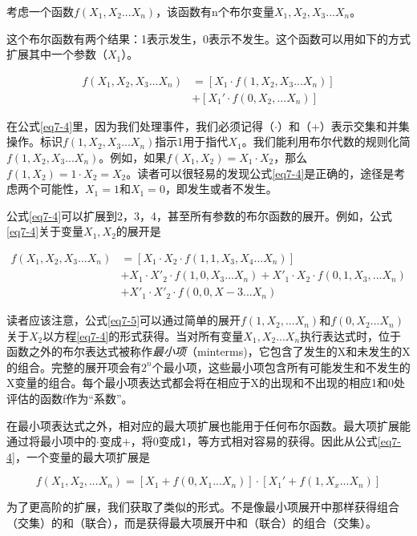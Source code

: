 \documentclass[cn,11pt,chinese]{elegantbook}
\begin{document}
{考虑一个函数$f(X_1,X_2...X_n)$，该函数有n个布尔变量$X_1,X_2,X_3...X_n$。

这个布尔函数有两个结果：1表示发生，0表示不发生。这个函数可以用如下的方式扩展其中一个参数（$X_1$）。

\begin{align}
\label{eq7-4}
f(X_1,X_2,X_3...X_n)&=[X_1 \cdot f(1,X_2,X_3...X_n)] \nonumber \\
&+[X_1' \cdot f(0,X_2,...X_n)]
\end{align}


在公式\ref{eq7-4}里，因为我们处理事件，我们必须记得（$\cdot$）和（+）表示交集和并集操作。标识$f(1,X_2,X_3...X_n)$指示1用于指代$X_1$。我们能利用布尔代数的规则化简$f(1,X_2,X_3...X_n)$。例如，如果$f(X_1,X_2)=X_1 \cdot X_2$，那么$f(1,X_2)=1 \cdot X_2=X_2$。读者可以很轻易的发现公式\ref{eq7-4}是正确的，途径是考虑两个可能性，$X_1=1 和 X_1=0$，即发生或者不发生。

公式\ref{eq7-4}可以扩展到2，3，4，甚至所有参数的布尔函数的展开。例如，公式\ref{eq7-4}关于变量$X_1,X_2$的展开是

\begin{align}
\label{eq7-5}
f(X_1,X_2,X_3...X_n) &=[X_1 \cdot X_2 \cdot f(1,1,X_3,X_4...X_n)] \nonumber \\
&+X_1 \cdot X'_2 \cdot f(1,0,X_3...X_n)+X'_1 \cdot X_2 \cdot f(0,1,X_3,...X_n)  \nonumber \\
&+X'_1 \cdot X'_2 \cdot f(0,0,X-3...X_n)
\end{align}

读者应该注意，公式\ref{eq7-5}可以通过简单的展开$f(1,X_2,...X_n)$和$f(0,X_2...X_n)$关于$X_2$以方程\ref{eq7-4}的形式获得。当对所有变量$X_1,X_2...X_n$执行表达式时，位于函数之外的布尔表达式被称作\emph{最小项}（minterms)，它包含了发生的X和未发生的X的组合。完整的展开项会有$2^n$个最小项，这些最小项包含所有可能发生和不发生的X变量的组合。每个最小项表达式都会将在相应于X的出现和不出现的相应1和0处评估的函数f作为“系数”。

在最小项表达式之外，相对应的最大项扩展也能用于任何布尔函数。最大项扩展能通过将最小项中的$\cdot$变成$+$，将0变成1，等方式相对容易的获得。因此从公式\ref{eq7-4}，一个变量的最大项扩展是

\begin{equation}\label{eq7-6}
f(X_1,X_2,...X_n)=[X_1+f(0,X_1...X_n)]\cdot[X_1'+f(1,X_x...X_n)] 
\end{equation}

为了更高阶的扩展，我们获取了类似的形式。不是像最小项展开中那样获得组合（交集）的和（联合），而是获得最大项展开中和（联合）的组合（交集）。

}
\end{document}
